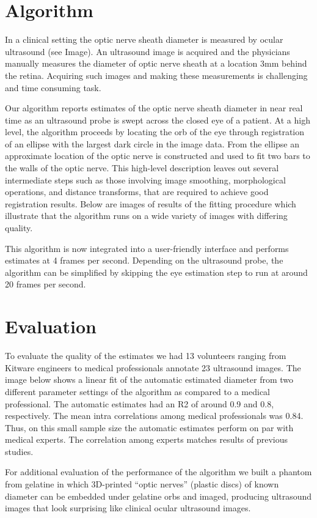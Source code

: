 \documentclass{llncs}
\begin{document}
\section{Algorithm}
In a clinical setting the optic nerve sheath diameter is measured by ocular
ultrasound (see Image). An ultrasound image is acquired and the physicians
manually measures the diameter of optic nerve sheath at a location 3mm behind
the retina. Acquiring such images and making these measurements is challenging
and time consuming task.

Our algorithm reports estimates of the optic nerve sheath diameter in near real
time as an ultrasound probe is swept across the closed eye of a patient. At a
high level, the algorithm proceeds by locating the orb of the eye through
registration of an ellipse with the largest dark circle in the image data. From
the ellipse an approximate location of the optic nerve is constructed and used
to fit two bars to the walls of the optic nerve. This high-level description
leaves out several intermediate steps such as those involving image smoothing,
morphological operations, and distance transforms, that are required to achieve
good registration results. Below are images of results of the fitting procedure
which illustrate that the algorithm runs on a wide variety of images with
differing quality.


This algorithm is now integrated into a user-friendly interface and performs
estimates at 4 frames per second. Depending on the ultrasound probe, the
algorithm can be simplified by skipping the eye estimation step to run at
around 20 frames per second.

\section{Evaluation}
To evaluate the quality of the estimates we had 13 volunteers ranging from
Kitware engineers to medical professionals annotate 23 ultrasound images.  The
image below shows a linear fit of the automatic estimated diameter from two
different parameter settings of the algorithm as compared to a medical
professional. The automatic estimates had an R2 of around 0.9 and 0.8,
respectively. The mean intra correlations among medical professionals was 0.84.
Thus, on this small sample size the automatic estimates perform on par with
medical experts. The correlation among experts matches results of previous
studies.

For additional evaluation of the performance of the algorithm we built a
phantom from gelatine in which 3D-printed “optic nerves” (plastic discs) of
known diameter can be embedded under gelatine orbs and imaged, producing
ultrasound images that look surprising like clinical ocular ultrasound images.
\end{document}
